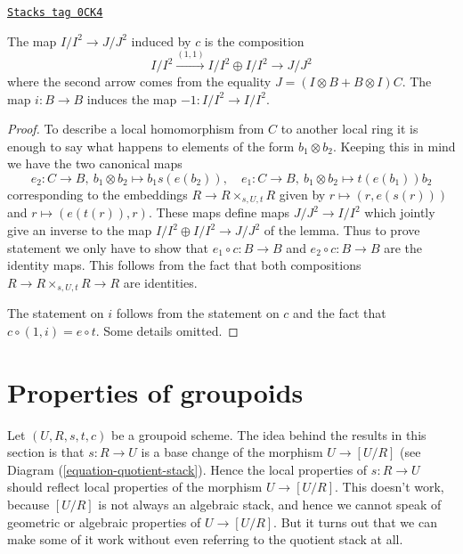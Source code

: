 \begin{lemma}
\label{more-groupoids-lemma-first-order-structure-c}
\href{https://stacks.math.columbia.edu/tag/0CK4}{\texttt{Stacks tag 0CK4}}

The map $I/I^2 \to J/J^2$ induced by $c$ is the composition
$$
I/I^2 \xrightarrow{(1, 1)} I/I^2 \oplus I/I^2 \to J/J^2
$$
where the second arrow comes from the equality
$J = (I \otimes B + B \otimes I)C$.
The map $i : B \to B$ induces the map $-1 : I/I^2 \to I/I^2$.
\end{lemma}

\begin{proof}
To describe a local homomorphism from $C$ to another local ring
it is enough to say what happens to elements of the form
$b_1 \otimes b_2$. Keeping this in mind we have the two canonical maps
$$
e_2 : C \to B,\ b_1 \otimes b_2 \mapsto b_1s(e(b_2)),\quad
e_1 : C \to B,\ b_1 \otimes b_2 \mapsto t(e(b_1))b_2
$$
corresponding to the embeddings
$R \to R \times_{s, U, t} R$ given by
$r \mapsto (r, e(s(r)))$ and $r \mapsto (e(t(r)), r)$.
These maps define maps $J/J^2 \to I/I^2$ which jointly
give an inverse to the map $I/I^2 \oplus I/I^2 \to J/J^2$
of the lemma. Thus to prove statement we only have to show
that $e_1 \circ c : B \to B$ and $e_2 \circ c : B \to B$
are the identity maps. This follows from the fact that both
compositions $R \to R \times_{s, U, t} R \to R$ are identities.

\medskip\noindent
The statement on $i$ follows from the statement on $c$ and the
fact that $c \circ (1, i) = e \circ t$. Some details omitted.
\end{proof}

\section{Properties of groupoids}
\label{more-groupoids-section-technical-lemma}
Let $(U, R, s, t, c)$ be a groupoid scheme.
The idea behind the results in this section is that $s: R \to U$
is a base change of the morphism $U \to [U/R]$ (see
Diagram (\ref{equation-quotient-stack}).
Hence the local properties of $s : R \to U$ should reflect local
properties of the morphism $U \to [U/R]$.
This doesn't work, because $[U/R]$ is not always an algebraic stack, and
hence we cannot speak of geometric or algebraic properties of
$U \to [U/R]$.
But it turns out that we can make some of it work without even
referring to the quotient stack at all.

